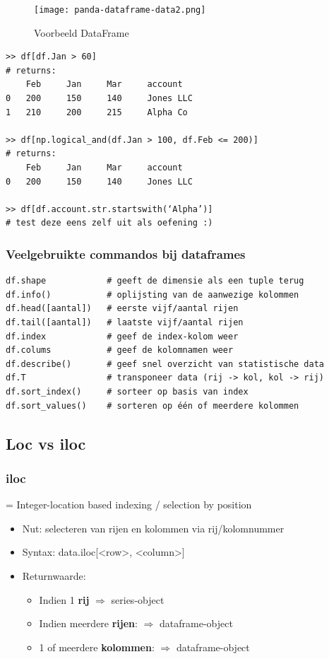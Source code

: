 \documentclass{article}
\begin{document}
\begin{figure}[H]
    \centering
    \texttt{[image: panda-dataframe-data2.png]}
    \caption{Voorbeeld DataFrame}
\end{figure}

\begin{verbatim}
>> df[df.Jan > 60]
# returns:
    Feb     Jan     Mar     account
0   200     150     140     Jones LLC
1   210     200     215     Alpha Co

>> df[np.logical_and(df.Jan > 100, df.Feb <= 200)]
# returns:
    Feb     Jan     Mar     account
0   200     150     140     Jones LLC

>> df[df.account.str.startswith(‘Alpha’)]
# test deze eens zelf uit als oefening :)
\end{verbatim}

\subsubsection{Veelgebruikte commandos bij dataframes}

\begin{verbatim}
df.shape            # geeft de dimensie als een tuple terug
df.info()           # oplijsting van de aanwezige kolommen
df.head([aantal])   # eerste vijf/aantal rijen
df.tail([aantal])   # laatste vijf/aantal rijen
df.index            # geef de index-kolom weer
df.colums           # geef de kolomnamen weer
df.describe()       # geef snel overzicht van statistische data
df.T                # transponeer data (rij -> kol, kol -> rij)
df.sort_index()     # sorteer op basis van index
df.sort_values()    # sorteren op één of meerdere kolommen
\end{verbatim}


\subsection{Loc vs iloc}

\subsubsection{iloc}

= Integer-location based indexing / selection by position

\begin{itemize}
    \item Nut: selecteren van rijen en kolommen via rij/kolomnummer
    \item Syntax: data.iloc[<row>, <column>]
    \item Returnwaarde:
    \begin{itemize}
        \item Indien 1 \textbf{rij} $\Rightarrow$ series-object
        \item Indien meerdere \textbf{rijen}: $\Rightarrow$ dataframe-object
        \item 1 of meerdere \textbf{kolommen}: $\Rightarrow$ dataframe-object 
    \end{itemize}
\end{itemize}
\end{document}
